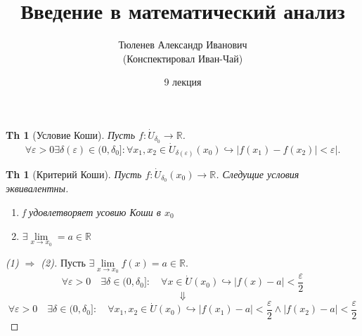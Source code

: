 \documentclass[a5paper, 10pt]{article}
\theoremstyle{plain}
\newtheorem{theorem}{Th}
\newtheorem*{theorem_}{Th}
\newcommand{\R}{\mathbb R}
\newcommand{\eps}{\varepsilon}
\newcommand{\hrarrow}{\hookrightarrow}
\newcommand{\Rarrow}{\Rightarrow}
\begin{document}
	\author{Тюленев Александр Иванович\\(Конспектировал Иван-Чай)}
	\date{9 лекция}
	\title{Введение в математический анализ}

	\linespread{1.4}
	\selectfont

	\maketitle
	\newpage

	\tableofcontents

    \begin{theorem}[Условие Коши]
        Пусть $ f: \dot{U}_{\delta_0} \to \R $.
        \[
            \forall \eps > 0 \exists \delta(\eps) \in (0, \delta_0]: \forall x_1, x_2 \in \dot{U}_{\delta(\eps)}(x_0) \hrarrow |f(x_1) - f(x_2)| < \eps |
        .\]
    \end{theorem}
    \begin{theorem_}[Критерий Коши]
        Пусть $ f: \dot{U}_{\delta_0}(x_0) \to \R $.
        Следущие условия эквивалентны.
        \begin{enumerate}
            \item f удовлетворяет усовию Коши в $ x_0 $
            \item $ \exists \lim\limits_{x \to x_0} = a \in \R $
        \end{enumerate}
    \end{theorem_}

    \begin{proof}[(1) $ \Rarrow $ (2)]
        Пусть $ \exists \lim\limits_{x \to x_0} f(x) = a \in \R $.
        \[ \forall \eps > 0 \quad \exists \delta \in (0, \delta_0]: \quad \forall x \in \dot{U}(x_0) \hrarrow |f(x) - a| < \frac{\eps}{2} \]
        \[ \Downarrow \]
        \[ \forall \eps > 0 \quad \exists \delta \in (0, \delta_0]: \quad \forall x_1, x_2 \in \dot{U}(x_0) \hrarrow
            |f(x_1) - a| < \frac{\eps}{2} \land
            |f(x_2) - a| < \frac{\eps}{2} \]
    \end{proof}
\end{document}
